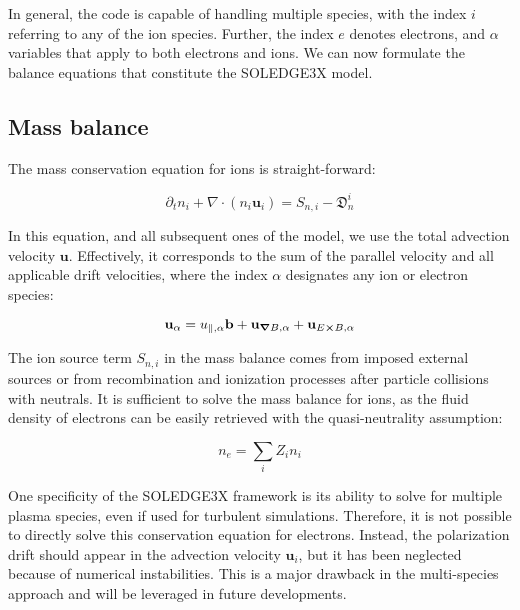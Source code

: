 In general, the code is capable of handling multiple species, with the index $i$ referring to any of the ion species. Further, the index $e$ denotes electrons, and $\alpha$ variables that apply to both electrons and ions. We can now formulate the balance equations that constitute the SOLEDGE3X model.



\subsection{Mass balance}

The mass conservation equation for ions is straight-forward:

\begin{equation}
	\partial_t n_i + \nabla\cdot\left(n_i\mathbf{u}_i\right) = S_{n,i} - \mathfrak{D}_n^i
\end{equation}

In this equation, and all subsequent ones of the model, we use the total advection velocity $\mathbf{u}$. Effectively, it corresponds to the sum of the parallel velocity and all applicable drift velocities, where the index $\alpha$ designates any ion or electron species:

\begin{equation}
	\mathbf{u}_\alpha = u_{\parallel,\alpha} \mathbf{b} + \mathbf{u}_{\grad B,\alpha} + \mathbf{u}_{E\cross B,\alpha}
\end{equation}

The ion source term $S_{n,i}$ in the mass balance comes from imposed external sources or from recombination and ionization processes after particle collisions with neutrals. It is sufficient to solve the mass balance for ions, as the fluid density of electrons can be easily retrieved with the quasi-neutrality assumption:

\begin{equation}
	n_e = \sum_{i}Z_i n_i
\end{equation}

One specificity of the SOLEDGE3X framework is its ability to solve for multiple plasma species, even if used for turbulent simulations. Therefore, it is not possible to directly solve this conservation equation for electrons. Instead, the polarization drift should appear in the advection velocity $\mathbf{u}_i$, but it has been neglected because of numerical instabilities\cite{Bufferand2021}. This is a major drawback in the multi-species approach and will be leveraged in future developments.

